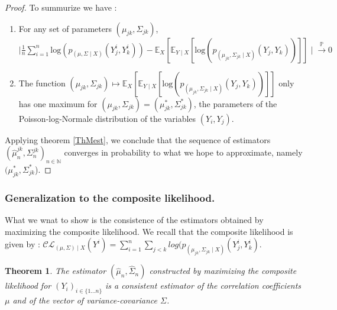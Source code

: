 \documentclass[11pt, a4paper]{article}
\newtheorem{theorem}{Theorem}
\begin{document}
\begin{proof}
To summurize we have :
\begin{enumerate}
\item For any set of parameters $(\mu_{jk},\Sigma_{jk})$,\\
 $\mid \frac{1}{n} \sum_{i=1}^{n} \mathrm{log}(p_{(\mu,\Sigma \mid X)}(Y^i_j,Y^i_k)) - \mathbb{E}_X[\mathbb{E}_{Y\mid X}[\mathrm{log}(p_{(\mu_{jk},\Sigma_{jk} \mid X)}(Y_j,Y_k))]] \mid \overset{\mathbb{P}}{\longrightarrow} 0 $ 
\item The function $(\mu_{jk},\Sigma_{jk})\mapsto \mathbb{E}_X[\mathbb{E}_{Y\mid X}[\mathrm{log}(p_{(\mu_{jk},\Sigma_{jk} \mid X)}(Y_j,Y_k))]] $ only has one maximum for $(\mu_{jk},\Sigma_{jk})=(\mu^\ast_{jk},\Sigma^\ast_{jk})$, the parameters of the Poisson-log-Normale distribution of the variables $(Y_i,Y_j)$.
\end{enumerate}
Applying theorem \ref{ThMest}, we conclude that the sequence of estimators $(\widehat{\mu}^{jk}_n, \Sigma^{jk}_n)_{n \in \mathbb{N}}$ converges in probability to what we hope to approximate, namely $(\mu^\ast_{jk}, \Sigma^\ast_{jk}$).
\end{proof}

\subsubsection{Generalization to the composite likelihood.}
What we wnat to show is the consistence of the estimators obtained by maximizing the composite likelihood. We recall that the composite likelihood is given by : $\mathcal{CL}_{(\mu,\Sigma) \mid X}(Y^i)=\sum_{i=1}^{n} \sum_{j<k} log(p_{(\mu_{jk},\Sigma_{jk} \mid X)} (Y^i_j,Y^i_k)$.\\
\begin{theorem}
The estimator $(\widehat{\mu}_n,\widehat{\Sigma}_n)$ constructed by maximizing the composite likelihood for $(Y_i)_{i \in \{1...n\}}$ is a consistent estimator of the correlation coefficients $\mu$ and of the vector of variance-covariance $\Sigma$.
\end{theorem}
\end{document}
